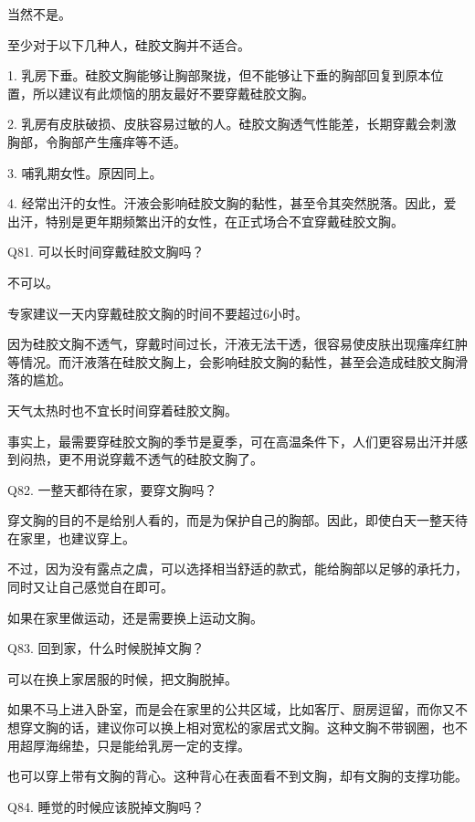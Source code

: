 \documentclass[12pt,UTF8]{ctexbook}
\begin{document}
当然不是。

至少对于以下几种人，硅胶文胸并不适合。

1. 乳房下垂。硅胶文胸能够让胸部聚拢，但不能够让下垂的胸部回复到原本位置，所以建议有此烦恼的朋友最好不要穿戴硅胶文胸。

2. 乳房有皮肤破损、皮肤容易过敏的人。硅胶文胸透气性能差，长期穿戴会刺激胸部，令胸部产生瘙痒等不适。

3. 哺乳期女性。原因同上。

4. 经常出汗的女性。汗液会影响硅胶文胸的黏性，甚至令其突然脱落。因此，爱出汗，特别是更年期频繁出汗的女性，在正式场合不宜穿戴硅胶文胸。





Q81. 可以长时间穿戴硅胶文胸吗？


不可以。

专家建议一天内穿戴硅胶文胸的时间不要超过6小时。

因为硅胶文胸不透气，穿戴时间过长，汗液无法干透，很容易使皮肤出现瘙痒红肿等情况。而汗液落在硅胶文胸上，会影响硅胶文胸的黏性，甚至会造成硅胶文胸滑落的尴尬。

天气太热时也不宜长时间穿着硅胶文胸。

事实上，最需要穿硅胶文胸的季节是夏季，可在高温条件下，人们更容易出汗并感到闷热，更不用说穿戴不透气的硅胶文胸了。





Q82. 一整天都待在家，要穿文胸吗？


穿文胸的目的不是给别人看的，而是为保护自己的胸部。因此，即使白天一整天待在家里，也建议穿上。

不过，因为没有露点之虞，可以选择相当舒适的款式，能给胸部以足够的承托力，同时又让自己感觉自在即可。

如果在家里做运动，还是需要换上运动文胸。





Q83. 回到家，什么时候脱掉文胸？


可以在换上家居服的时候，把文胸脱掉。

如果不马上进入卧室，而是会在家里的公共区域，比如客厅、厨房逗留，而你又不想穿文胸的话，建议你可以换上相对宽松的家居式文胸。这种文胸不带钢圈，也不用超厚海绵垫，只是能给乳房一定的支撑。

也可以穿上带有文胸的背心。这种背心在表面看不到文胸，却有文胸的支撑功能。





Q84. 睡觉的时候应该脱掉文胸吗？
\end{document}
